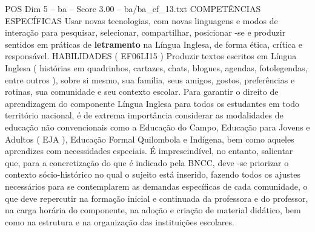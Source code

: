 \begin{textsample}{POS Dim 5 – ba – Score 3.00 – ba/ba\_ef\_13.txt}
COMPETÊNCIAS ESPECÍFICAS Usar novas tecnologias, com novas linguagens e modos de interação para pesquisar, selecionar, compartilhar, posicionar -se e produzir sentidos em práticas de \textbf{letramento} na Língua Inglesa, de forma ética, crítica e responsável.
HABILIDADES ( EF06LI15 ) Produzir textos escritos em Língua Inglesa ( histórias em quadrinhos, cartazes, chats, blogues, agendas, fotolegendas, entre outros ), sobre si mesmo, sua família, seus amigos, gostos, preferências e rotinas, sua comunidade e seu contexto escolar.
Para garantir o direito de aprendizagem do componente Língua Inglesa para todos os estudantes em todo território nacional, é de extrema importância considerar as modalidades de educação não convencionais como a Educação do Campo, Educação para Jovens e Adultos ( EJA ), Educação Formal Quilombola e Indígena, bem como aqueles aprendizes com necessidades especiais.
É imprescindível, no entanto, salientar que, para a concretização do que é indicado pela BNCC, deve -se priorizar o contexto sócio-histórico no qual o sujeito está inserido, fazendo todos os ajustes necessários para se contemplarem as demandas específicas de cada comunidade, o que deve repercutir na formação inicial e continuada da professora e do professor, na carga horária do componente, na adoção e criação de material didático, bem como na estrutura e na organização das instituições escolares.

\end{textsample}
